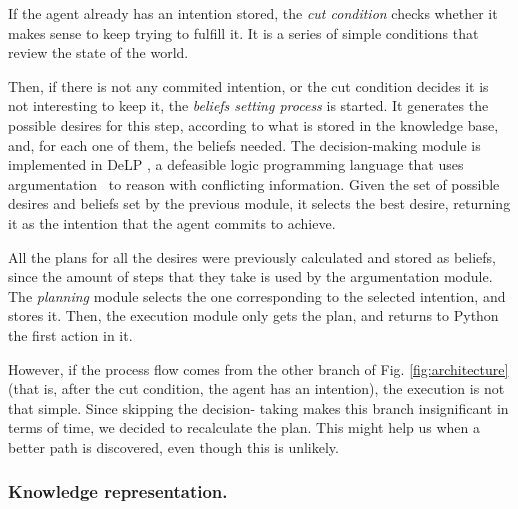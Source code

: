     If the agent already has an intention stored, the \textit{cut condition}
    checks whether it makes sense to keep trying to fulfill it. It is a series
    of simple conditions that review the state of the world.

    Then, if there is not any commited intention, or the cut condition decides
    it is not interesting to keep it, the \textit{beliefs setting process} is
    started. It generates the possible desires for this step, according to what
    is stored in the knowledge base, and, for each one of them, the beliefs
    needed.  The decision-making module is implemented in
    DeLP\cite{Rotstein:2007} \cite{Ferretti:2008}, a defeasible logic
    programming language that uses argumentation \cite{DBLP:conf/comma/2008}\ to
    reason with conflicting information.  Given the set of possible desires and
    beliefs set by the previous module, it selects the best desire, returning it
    as the intention that the agent commits to achieve.

    All the plans for all the desires were previously calculated and stored as 
    beliefs, since the amount of steps that they take is used by the 
    argumentation module. The \textit{planning} module selects the one 
    corresponding to the selected intention, and stores it. Then, the 
    execution module only gets the plan, and returns to Python the first 
    action in it.

    However, if the process flow comes from the other branch of Fig. 
    \ref{fig:architecture} (that is, after the cut condition, the agent has an 
    intention), the execution is not that simple. Since skipping the decision-
    taking makes this branch insignificant in terms of time, we decided to 
    recalculate the plan. This might help us when a better path is discovered, 
    even though this is unlikely.

\subsubsection{Knowledge representation.}





